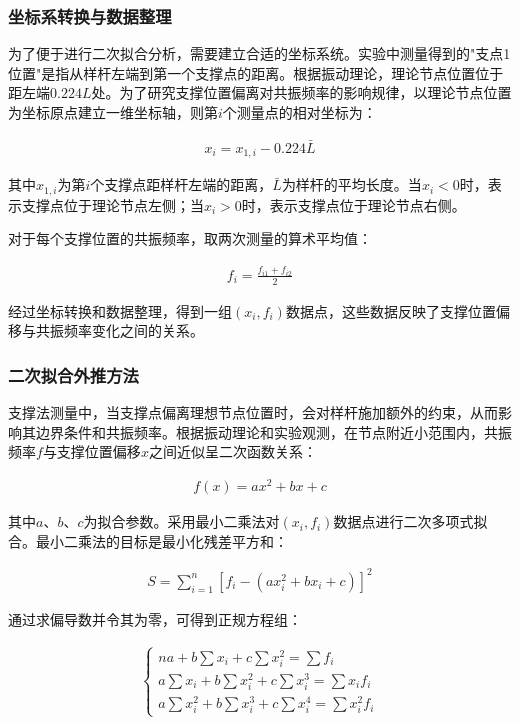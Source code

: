﻿\documentclass[12pt,a4paper]{article}
\begin{document}
\subsubsection{坐标系转换与数据整理}

为了便于进行二次拟合分析，需要建立合适的坐标系统。实验中测量得到的"支点1位置"是指从样杆左端到第一个支撑点的距离。根据振动理论，理论节点位置位于距左端$0.224L$处。为了研究支撑位置偏离对共振频率的影响规律，以理论节点位置为坐标原点建立一维坐标轴，则第$i$个测量点的相对坐标为：

\begin{align}
x_i = x_{1,i} - 0.224\bar{L} \tag{9}
\end{align}

其中$x_{1,i}$为第$i$个支撑点距样杆左端的距离，$\bar{L}$为样杆的平均长度。当$x_i < 0$时，表示支撑点位于理论节点左侧；当$x_i > 0$时，表示支撑点位于理论节点右侧。

对于每个支撑位置的共振频率，取两次测量的算术平均值：

\begin{align}
f_i = \frac{f_{i1} + f_{i2}}{2} \tag{10}
\end{align}

经过坐标转换和数据整理，得到一组$(x_i, f_i)$数据点，这些数据反映了支撑位置偏移与共振频率变化之间的关系。

\subsubsection{二次拟合外推方法}

支撑法测量中，当支撑点偏离理想节点位置时，会对样杆施加额外的约束，从而影响其边界条件和共振频率。根据振动理论和实验观测，在节点附近小范围内，共振频率$f$与支撑位置偏移$x$之间近似呈二次函数关系：

\begin{align}
f(x) = ax^2 + bx + c \tag{11}
\end{align}

其中$a$、$b$、$c$为拟合参数。采用最小二乘法对$(x_i, f_i)$数据点进行二次多项式拟合。最小二乘法的目标是最小化残差平方和：

\begin{align}
S = \sum_{i=1}^{n}[f_i - (ax_i^2 + bx_i + c)]^2 \tag{12}
\end{align}

通过求偏导数并令其为零，可得到正规方程组：

\begin{align}
\begin{cases}
na + b\sum x_i + c\sum x_i^2 = \sum f_i \\
a\sum x_i + b\sum x_i^2 + c\sum x_i^3 = \sum x_if_i \\
a\sum x_i^2 + b\sum x_i^3 + c\sum x_i^4 = \sum x_i^2f_i
\end{cases} \tag{13}
\end{align}
\end{document}
